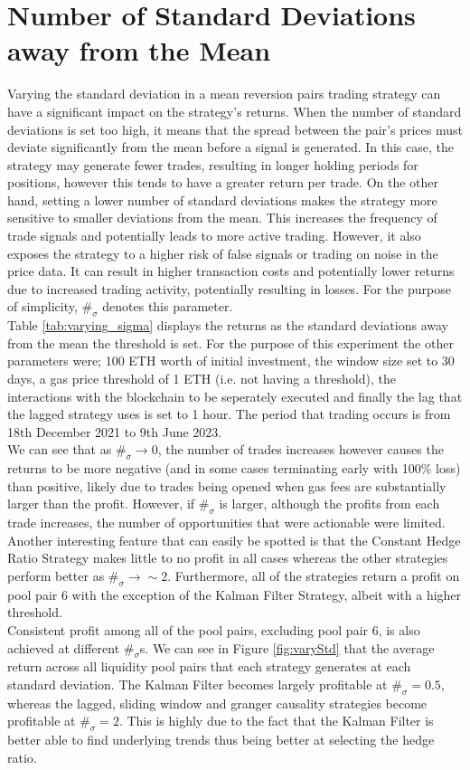 \section{Number of Standard Deviations away from the Mean}
Varying the standard deviation in a mean reversion pairs trading strategy can have a significant impact on the strategy's returns. When the number of standard deviations is set too high, it means that the spread between the pair's prices must deviate significantly from the mean before a signal is generated. In this case, the strategy may generate fewer trades, resulting in longer holding periods for positions, however this tends to have a greater return per trade. On the other hand, setting a lower number of standard deviations makes the strategy more sensitive to smaller deviations from the mean. This increases the frequency of trade signals and potentially leads to more active trading. However, it also exposes the strategy to a higher risk of false signals or trading on noise in the price data. It can result in higher transaction costs and potentially lower returns due to increased trading activity, potentially resulting in losses. For the purpose of simplicity, $\#_{\sigma}$ denotes this parameter.
\\[5mm]
Table \ref{tab:varying_sigma} displays the returns as the standard deviations away from the mean the threshold is set. For the purpose of this experiment the other parameters were; 100 ETH worth of initial investment, the window size set to 30 days, a gas price threshold of 1 ETH (i.e. not having a threshold), the interactions with the blockchain to be seperately executed and finally the lag that the lagged strategy uses is set to 1 hour. The period that trading occurs is from 18th December 2021 to 9th June 2023.
\\[5mm]
We can see that as $\#_{\sigma} \rightarrow 0$, the number of trades increases however causes the returns to be more negative (and in some cases terminating early with 100\% loss) than positive, likely due to trades being opened when gas fees are substantially larger than the profit. However, if $\#_{\sigma}$ is larger, although the profits from each trade increases, the number of opportunities that were actionable were limited. Another interesting feature that can easily be spotted is that the Constant Hedge Ratio Strategy makes little to no profit in all cases whereas the other strategies perform better as $\#_{\sigma} \rightarrow \sim2$. Furthermore, all of the strategies return a profit on pool pair 6 with the exception of the Kalman Filter Strategy, albeit with a higher threshold.
\\[5mm]
Consistent profit among all of the pool pairs, excluding pool pair 6, is also achieved at different $\#_{\sigma}$s. We can see in Figure \ref{fig:varyStd} that the average return across all liquidity pool pairs that each strategy generates at each standard deviation. The Kalman Filter becomes largely profitable at $\#_{\sigma} = 0.5$, whereas the lagged, sliding window and granger causality strategies become profitable at $\#_{\sigma} = 2$. This is highly due to the fact that the Kalman Filter is better able to find underlying trends thus being better at selecting the hedge ratio.

